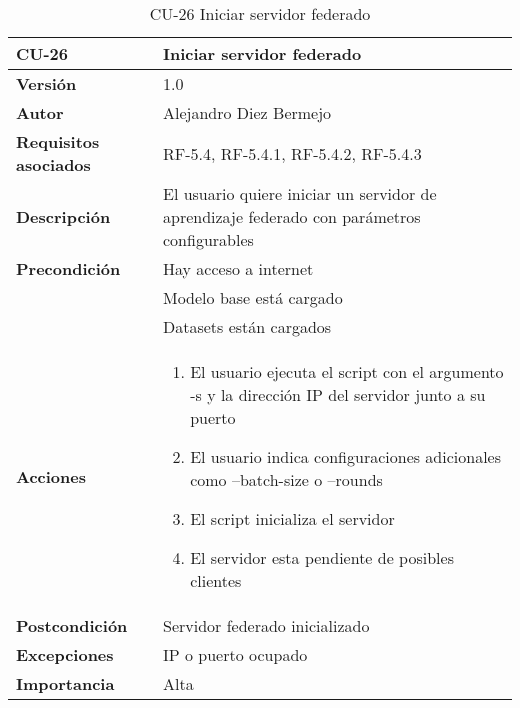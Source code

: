 \begin{table}[p]
	\centering
	\begin{tabularx}{\linewidth}{ p{} p{} }
		\toprule
		\textbf{CU-26}    & \textbf{Iniciar servidor federado}\\
		\toprule
		\textbf{Versión}              & 1.0    \\
		\textbf{Autor}                & Alejandro Diez Bermejo \\
		\textbf{Requisitos asociados} & RF-5.4, RF-5.4.1, RF-5.4.2, RF-5.4.3 \\
		\textbf{Descripción}          & El usuario quiere iniciar un servidor de aprendizaje federado con parámetros configurables \\
        \textbf{Precondición}         & Hay acceso a internet \\
                                      & Modelo base está cargado \\
                                      & Datasets están cargados \\
		\textbf{Acciones}             &
		\begin{enumerate}
			\def\labelenumi{\arabic{enumi}.}
			\tightlist
            \item El usuario ejecuta el script con el argumento -s y la dirección IP del servidor junto a su puerto
            \item El usuario indica configuraciones adicionales como --batch-size o --rounds
            \item El script inicializa el servidor
            \item El servidor esta pendiente de posibles clientes
		\end{enumerate}\\
		\textbf{Postcondición}        & Servidor federado inicializado \\
		\textbf{Excepciones}          & IP o puerto ocupado \\
		\textbf{Importancia}          & Alta \\
		\bottomrule
	\end{tabularx}
	\caption{CU-26 Iniciar servidor federado}
\end{table}

